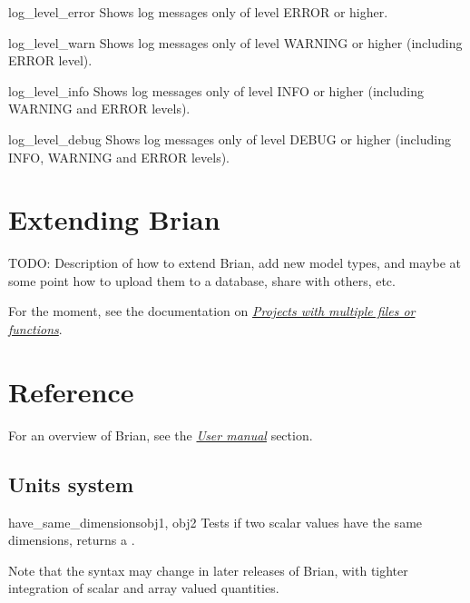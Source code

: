 \documentclass[letterpaper,10pt]{manual}
\begin{document}
\hypertarget{brian.log_level_error}{}\begin{funcdesc}{log\_level\_error}{}
Shows log messages only of level ERROR or higher.
\end{funcdesc}


\hypertarget{brian.log_level_warn}{}\begin{funcdesc}{log\_level\_warn}{}
Shows log messages only of level WARNING or higher (including ERROR level).
\end{funcdesc}


\hypertarget{brian.log_level_info}{}\begin{funcdesc}{log\_level\_info}{}
Shows log messages only of level INFO or higher (including WARNING and ERROR levels).
\end{funcdesc}


\hypertarget{brian.log_level_debug}{}\begin{funcdesc}{log\_level\_debug}{}
Shows log messages only of level DEBUG or higher (including INFO, WARNING and ERROR levels).
\end{funcdesc}

\resetcurrentobjects


\chapter{Extending Brian}

TODO: Description of how to extend Brian, add new model types, and maybe at
some point how to upload them to a database, share with others, etc.

For the moment, see the documentation on \hyperlink{projects-with-multiple-files}{\emph{Projects with multiple files or functions}}.

\resetcurrentobjects


\chapter{Reference}

For an overview of Brian, see the \hyperlink{user-manual}{\emph{User manual}} section.

\resetcurrentobjects
{}

\hypertarget{index-95}{}\section{Units system}


\hypertarget{brian.have_same_dimensions}{}\begin{funcdesc}{have\_same\_dimensions}{obj1, obj2}
Tests if two scalar values have the same dimensions, returns a .

Note that the syntax may change in later releases of Brian, with tighter
integration of scalar and array valued quantities.
\end{funcdesc}
\end{document}
